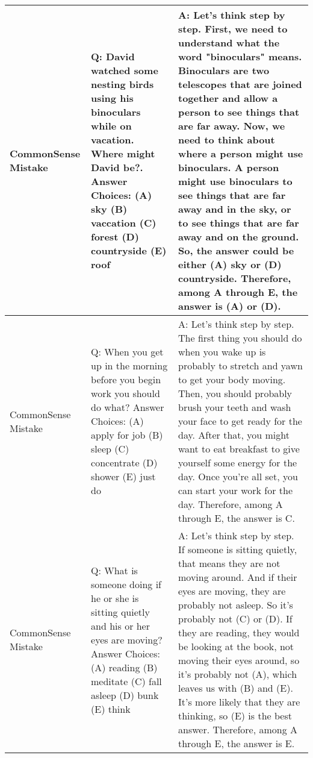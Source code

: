 \documentclass{article}
\newcommand{\theirsz}{Zero-shot\xspace}
\newcommand{\ngmark}{{\textbf{\color{red}{\ding{55}}}}}
\newcommand{\bblue}[1]{{\textbf{\color{blue}{#1}}}}
\newcommand{\myspace}{}
\begin{document}
\begin{center}
\begin{longtable}{|p{}|p{}|p{}|}
CommonSense Mistake &Q: David watched some nesting birds using his binoculars while on vacation. Where might David be?. Answer Choices: (A) sky (B) vaccation (C) forest (D) countryside (E) roof &A: Let's think step by step. First, we need to understand what the word "binoculars" means. Binoculars are two telescopes that are joined together and allow a person to see things that are far away. Now, we need to think about where a person might use binoculars. A person might use binoculars to see things that are far away and in the sky, or to see things that are far away and on the ground. So, the answer could be either (A) sky or (D) countryside. Therefore, among A through E, the answer is (A) or (D). \ngmark \myspace \bblue{(GT : (C), \theirsz : (D))} \\

\midrule

CommonSense Mistake &Q: When you get up in the morning before you begin work you should do what? Answer Choices: (A) apply for job (B) sleep (C) concentrate (D) shower (E) just do &A: Let's think step by step. The first thing you should do when you wake up is probably to stretch and yawn to get your body moving. Then, you should probably brush your teeth and wash your face to get ready for the day. After that, you might want to eat breakfast to give yourself some energy for the day. Once you're all set, you can start your work for the day. Therefore, among A through E, the answer is C.  \ngmark \myspace \bblue{(GT : (D), \theirsz : (C))} \\

\midrule

CommonSense Mistake &Q: What is someone doing if he or she is sitting quietly and his or her eyes are moving? Answer Choices: (A) reading (B) meditate (C) fall asleep (D) bunk (E) think &A: Let's think step by step. If someone is sitting quietly, that means they are not moving around. And if their eyes are moving, they are probably not asleep. So it's probably not (C) or (D). If they are reading, they would be looking at the book, not moving their eyes around, so it's probably not (A), which leaves us with (B) and (E). It's more likely that they are thinking, so (E) is the best answer. Therefore, among A through E, the answer is E. \ngmark \myspace \bblue{(GT : (A), \theirsz : (E))}\\

\midrule






\end{longtable}
\end{center}
\end{document}
